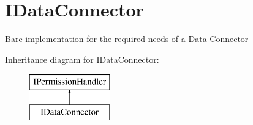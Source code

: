 \hypertarget{interfaceOTA_1_1Data_1_1IDataConnector}{}\section{I\+Data\+Connector}
\label{interfaceOTA_1_1Data_1_1IDataConnector}


Bare implementation for the required needs of a \hyperlink{namespaceOTA_1_1Data}{Data} Connector  


Inheritance diagram for I\+Data\+Connector\+:\begin{figure}[H]
\begin{center}
\leavevmode
\includegraphics[height=2.000000cm]{interfaceOTA_1_1Data_1_1IDataConnector}
\end{center}
\end{figure}
